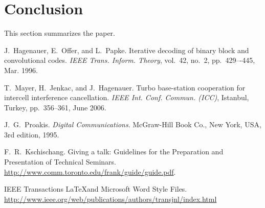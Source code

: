 \documentclass[journal, a4paper]{IEEEtran}
\begin{document}
\section{Conclusion}
    This section summarizes the paper.

\begin{thebibliography}{5}



    J.~Hagenauer, E.~Offer, and L.~Papke. Iterative decoding of binary block
    and convolutional codes. {\em IEEE Trans. Inform. Theory},
    vol.~42, no.~2, pp.~429–-445, Mar. 1996.

    T.~Mayer, H.~Jenkac, and J.~Hagenauer. Turbo base-station cooperation for intercell interference cancellation. {\em IEEE Int. Conf. Commun. (ICC)}, Istanbul, Turkey, pp.~356--361, June 2006.

    J.~G.~Proakis. {\em Digital Communications}. McGraw-Hill Book Co.,
    New York, USA, 3rd edition, 1995.

    F.~R.~Kschischang. Giving a talk: Guidelines for the Preparation and Presentation of Technical Seminars.
    \url{http://www.comm.toronto.edu/frank/guide/guide.pdf}.

    IEEE Transactions \LaTeX and Microsoft Word Style Files.
    \url{http://www.ieee.org/web/publications/authors/transjnl/index.html}

\end{thebibliography}

\end{document}
